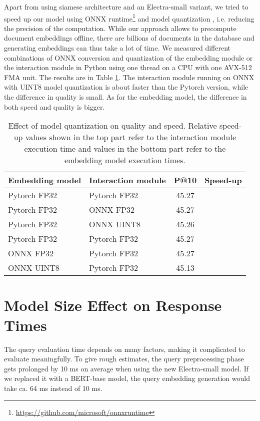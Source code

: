 \documentclass[letterpaper]{article} \usepackage{aaai22 }  \usepackage{times}  \usepackage{helvet}  \usepackage{courier}  \usepackage[hyphens]{url}  \usepackage{graphicx} \usepackage{amsmath,amsfonts,amssymb, mathabx,bm,bbm}
\begin{document}
Apart from using siamese architecture and an Electra-small variant, we tried to speed up our model using ONNX runtime\footnote{\url{https://github.com/microsoft/onnxruntime}}
and model quantization \cite{polino2018quantization}, i.e. reducing the precision of the computation. While our approach allows to precompute document embeddings offline, there are billions of documents in the database and generating embeddings can thus take a lot of time. We measured different combinations of ONNX conversion and quantization of the embedding module or the interaction module in Python using one thread on a CPU with one AVX-512 FMA unit. The results are in Table \ref{tab:quantization}. The interaction module running on ONNX with UINT8 model quantization is about  faster than the Pytorch version, while the difference in quality is small. As for the embedding model, the difference in both speed and quality is bigger.

\begin{table}[!h]
    \centering\footnotesize
    \begin{tabular}{llcc}
    \toprule
        Embedding model & Interaction module & P@10 & Speed-up \\\midrule
        Pytorch FP32 & Pytorch FP32 & 45.27 & \\
        Pytorch FP32 & ONNX FP32 & 45.27 & \\
        Pytorch FP32 & ONNX UINT8 & 45.26 & \\\midrule
        Pytorch FP32 & Pytorch FP32 & 45.27 & \\
        ONNX FP32 & Pytorch FP32 & 45.27 &  \\
        ONNX UINT8 & Pytorch FP32 & 45.13 & \\\bottomrule
    \end{tabular}
    \caption{Effect of model quantization on quality and speed. Relative speed-up values shown in the top part refer to the interaction module execution time and values in the bottom part refer to the embedding model execution times.}
    \label{tab:quantization}
\end{table}

\section{Model Size Effect on Response Times}

The query evaluation time depends on many factors, making it complicated to evaluate meaningfully. To give rough estimates, the query preprocessing phase gets prolonged by 10 ms on average when using the new Electra-small model. If we replaced it with a BERT-base model, the query embedding generation would take ca. 64 ms instead of 10 ms.
\end{document}
